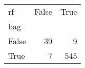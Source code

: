 \begin{tabular}{lrr}
\toprule
rf &  False &  True  \\
bag   &        &        \\
\midrule
False &     39 &      9 \\
True  &      7 &    545 \\
\bottomrule
\end{tabular}
